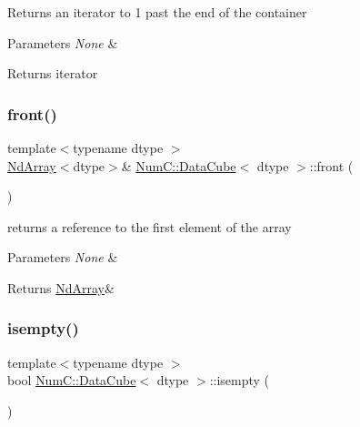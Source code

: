 Returns an iterator to 1 past the end of the container


\begin{DoxyParams}{Parameters}
{\em None} & \\
\hline
\end{DoxyParams}
\begin{DoxyReturn}{Returns}
iterator 
\end{DoxyReturn}
\mbox{\label{class_num_c_1_1_data_cube_a6fb33e49146d1fdbdeeff0a42f36749d}} 
\subsubsection{\texorpdfstring{front()}{front()}}
{\footnotesize\ttfamily template$<$typename dtype $>$ \\
\mbox{\hyperlink{class_num_c_1_1_nd_array}{Nd\+Array}}$<$dtype$>$\& \mbox{\hyperlink{class_num_c_1_1_data_cube}{Num\+C\+::\+Data\+Cube}}$<$ dtype $>$\+::front (\begin{DoxyParamCaption}{ }\end{DoxyParamCaption})\hspace{0.3cm}{\ttfamily [inline]}}

returns a reference to the first element of the array


\begin{DoxyParams}{Parameters}
{\em None} & \\
\hline
\end{DoxyParams}
\begin{DoxyReturn}{Returns}
\mbox{\hyperlink{class_num_c_1_1_nd_array}{Nd\+Array}}\& 
\end{DoxyReturn}
\mbox{\label{class_num_c_1_1_data_cube_a2f2f6afb06821995c7b640d96d2261fc}} 
\subsubsection{\texorpdfstring{isempty()}{isempty()}}
{\footnotesize\ttfamily template$<$typename dtype $>$ \\
bool \mbox{\hyperlink{class_num_c_1_1_data_cube}{Num\+C\+::\+Data\+Cube}}$<$ dtype $>$\+::isempty (\begin{DoxyParamCaption}{ }\end{DoxyParamCaption})\hspace{0.3cm}{\ttfamily [inline]}}

